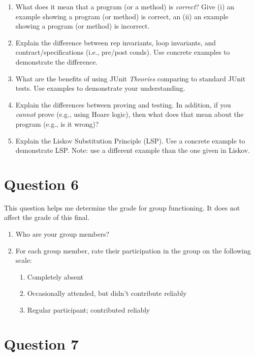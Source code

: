 \documentclass[10pt]{article}
\begin{document}
\begin{enumerate}
  \item What does it mean that a program (or a method) is \emph{correct}?  Give (i) an example showing a program (or method) is correct, an (ii) an example showing a program (or method) is incorrect.  
  \item Explain the difference between rep invariants, loop invariants, and contract/specifications (i.e., pre/post conds).  Use concrete examples to demonstrate the difference.  
  \item What are the benefits of using JUnit \emph{Theories} comparing to standard JUnit tests. Use examples to demonstrate your understanding.  
  \item Explain the differences between proving and testing.  In addition, if you \emph{cannot} prove (e.g., using Hoare logic), then what does that mean about the program (e.g., is it wrong)? 
  \item Explain the Liskov Substitution Principle (LSP).  Use a concrete example to demonstrate LSP. Note: use a different example than the one given in Liskov.  
\end{enumerate}


\newpage
\section{Question 6}

This question helps me determine the grade for group functioning.  It does not affect the grade of this final.

\begin{enumerate}
\item Who are your group members?
\item For each group member, rate their participation in the group on the following scale:
  \begin{enumerate}
  \item Completely absent
  \item Occasionally attended, but didn't contribute reliably
  \item Regular participant; contributed reliably
  \end{enumerate}
\end{enumerate}



\newpage
\section{Question 7}
\end{document}
